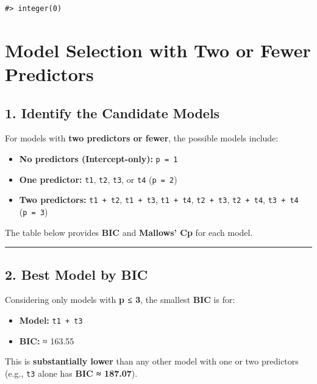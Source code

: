 \documentclass[
]{article}
\providecommand{\tightlist}{%
  \setlength{\itemsep}{0pt}\setlength{\parskip}{0pt}}
\begin{document}
\begin{verbatim}
#> integer(0)
\end{verbatim}

\section{Model Selection with Two or Fewer
Predictors}\label{model-selection-with-two-or-fewer-predictors}

\subsection{1. Identify the Candidate
Models}\label{identify-the-candidate-models}

For models with \textbf{two predictors or fewer}, the possible models
include:

\begin{itemize}
\tightlist
\item
  \textbf{No predictors (Intercept-only):} \texttt{p\ =\ 1}
\item
  \textbf{One predictor:} \texttt{t1}, \texttt{t2}, \texttt{t3}, or
  \texttt{t4} (\texttt{p\ =\ 2})
\item
  \textbf{Two predictors:} \texttt{t1\ +\ t2}, \texttt{t1\ +\ t3},
  \texttt{t1\ +\ t4}, \texttt{t2\ +\ t3}, \texttt{t2\ +\ t4},
  \texttt{t3\ +\ t4} (\texttt{p\ =\ 3})
\end{itemize}

The table below provides \textbf{BIC} and \textbf{Mallows' Cp} for each
model.

\begin{center}\rule{0.5\linewidth}{0.5pt}\end{center}

\subsection{2. Best Model by BIC}\label{best-model-by-bic}

Considering only models with \textbf{p ≤ 3}, the smallest \textbf{BIC}
is for:

\begin{itemize}
\tightlist
\item
  \textbf{Model:} \texttt{t1\ +\ t3}
\item
  \textbf{BIC:} ≈ 163.55
\end{itemize}

This is \textbf{substantially lower} than any other model with one or
two predictors (e.g., \texttt{t3} alone has \textbf{BIC ≈ 187.07}).
\end{document}
